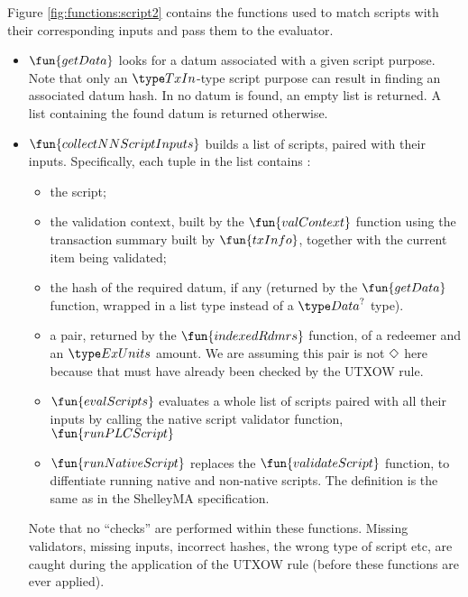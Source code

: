 Figure \ref{fig:functions:script2} contains the functions used to
match scripts with their corresponding inputs and pass them to the
evaluator.

\begin{itemize}
  \item $\fun{getData}$ looks for a datum associated with a given script purpose. Note that
  only an $\TxIn$-type script purpose can result in finding an associated datum hash.
  In no datum is found, an empty list is returned. A list containing the found datum
  is returned otherwise.

  \item $\fun{collectNNScriptInputs}$ builds a list of scripts, paired with their
  inputs. Specifically, each tuple in the list contains :

  \begin{itemize}
  \item the script;

  \item the validation context, built by the $\fun{valContext}$ function using
  the transaction summary built by $\fun{txInfo}$, together with the current item being validated;

  \item the hash of the required datum, if any (returned by the $\fun{getData}$ function,
  wrapped in a list type instead of a $\Data^?$ type).

  \item a pair, returned by the $\fun{indexedRdmrs}$ function, of a redeemer
  and an $\ExUnits$ amount. We are assuming this pair is not $\Diamond$ here
  because that must have already been checked by the UTXOW rule.

  \item $\fun{evalScripts}$ evaluates a whole list of scripts paired with all their
  inputs by calling the native script validator function, $\fun{runPLCScript}$

  \item $\fun{runNativeScript}$ replaces the $\fun{validateScript}$ function,
  to diffentiate running native and non-native scripts. The definition is the
  same as in the ShelleyMA specification.
\end{itemize}

Note that no ``checks'' are performed within these functions.
Missing validators, missing inputs, incorrect hashes, the wrong type of script etc,
are caught during the application of the UTXOW rule (before these functions are ever applied).
%

\end{itemize}

